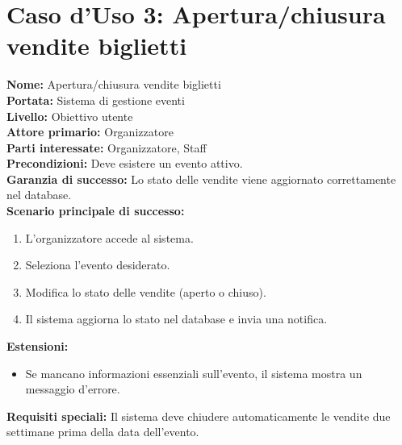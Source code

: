 \documentclass[a4paper,12pt]{article}
\begin{document}
\section*{\textcolor{sectioncolor}{Caso d'Uso 3: Apertura/chiusura vendite biglietti}}
\textcolor{textcolor}{
\textbf{Nome:} Apertura/chiusura vendite biglietti\\
\textbf{Portata:} Sistema di gestione eventi\\
\textbf{Livello:} Obiettivo utente\\
\textbf{Attore primario:} Organizzatore\\
\textbf{Parti interessate:} Organizzatore, Staff\\
\textbf{Precondizioni:} Deve esistere un evento attivo.\\
\textbf{Garanzia di successo:} Lo stato delle vendite viene aggiornato correttamente nel database.\\
\textbf{Scenario principale di successo:}
\begin{enumerate}
    \item L'organizzatore accede al sistema.
    \item Seleziona l'evento desiderato.
    \item Modifica lo stato delle vendite (aperto o chiuso).
    \item Il sistema aggiorna lo stato nel database e invia una notifica.
\end{enumerate}
\textbf{Estensioni:}
\begin{itemize}
    \item Se mancano informazioni essenziali sull'evento, il sistema mostra un messaggio d'errore.
\end{itemize}
\textbf{Requisiti speciali:} Il sistema deve chiudere automaticamente le vendite due settimane prima della data dell'evento.
}
\end{document}
